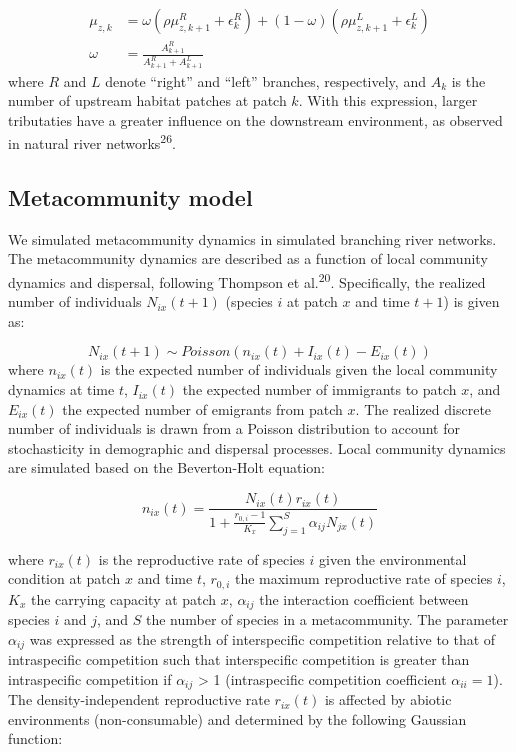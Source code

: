 \documentclass[
]{article}
\begin{document}
\[
\begin{align}
\mu_{z,k} &= \omega(\rho \mu_{z,k+1}^R + \epsilon_{k}^R) + (1-\omega)(\rho \mu_{z,k+1}^L + \epsilon_{k}^L) \\
\omega &= \frac{A_{k+1}^R}{A_{k+1}^R + A_{k+1}^L}
\end{align}
\] where \(R\) and \(L\) denote ``right'' and ``left'' branches,
respectively, and \(A_k\) is the number of upstream habitat patches at
patch \(k\). With this expression, larger tributaties have a greater
influence on the downstream environment, as observed in natural river
networks\textsuperscript{26}.

\hypertarget{metacommunity-model}{%
\subsection{Metacommunity model}\label{metacommunity-model}}

We simulated metacommunity dynamics in simulated branching river
networks. The metacommunity dynamics are described as a function of
local community dynamics and dispersal, following Thompson et
al.\textsuperscript{20}. Specifically, the realized number of
individuals \(N_{ix}(t + 1)\) (species \(i\) at patch \(x\) and time
\(t+1\)) is given as:

\[
N_{ix}(t + 1) \sim Poisson(n_{ix}(t) + I_{ix}(t) - E_{ix}(t))
\] where \(n_{ix}(t)\) is the expected number of individuals given the
local community dynamics at time \(t\), \(I_{ix}(t)\) the expected
number of immigrants to patch \(x\), and \(E_{ix}(t)\) the expected
number of emigrants from patch \(x\). The realized discrete number of
individuals is drawn from a Poisson distribution to account for
stochasticity in demographic and dispersal processes. Local community
dynamics are simulated based on the Beverton-Holt equation:

\[
n_{ix}(t) = \frac{N_{ix}(t)r_{ix}(t)}{1 + \frac{r_{0,i}-1}{K_{x}}\sum_{j=1}^S{\alpha_{ij}N_{jx}(t)}}
\]

where \(r_{ix}(t)\) is the reproductive rate of species \(i\) given the
environmental condition at patch \(x\) and time \(t\), \(r_{0,i}\) the
maximum reproductive rate of species \(i\), \(K_{x}\) the carrying
capacity at patch \(x\), \(\alpha_{ij}\) the interaction coefficient
between species \(i\) and \(j\), and \(S\) the number of species in a
metacommunity. The parameter \(\alpha_{ij}\) was expressed as the
strength of interspecific competition relative to that of intraspecific
competition such that interspecific competition is greater than
intraspecific competition if \(\alpha_{ij}\) \textgreater{} 1
(intraspecific competition coefficient \(\alpha_{ii} = 1\)). The
density-independent reproductive rate \(r_{ix}(t)\) is affected by
abiotic environments (non-consumable) and determined by the following
Gaussian function:
\end{document}
